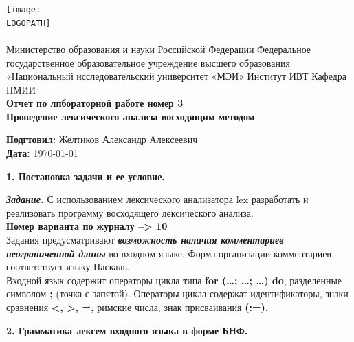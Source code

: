 \documentclass[12pt]{report}
\def \LOGOPATH {assets/logo3.png}
\def \DEPARTEMENT {Министерство образования и науки Российской Федерации 
Федеральное государственное образовательное учреждение высшего образования
\\ «Национальный исследовательский университет «МЭИ» 
Институт ИВТ
Кафедра ПМИИ
}
\def \REPORTTITLE {Отчет по лпбораторной работе номер 3 \\ Проведение лексического анализа восходящим методом}
\def \STUDENTNAME {Желтиков Александр Алексеевич}
\begin{document}

\begin{titlepage}
    \vfill
    \begin{center}
        \texttt{[image: \\LOGOPATH]} \\
        \hfill \\
        \Large{\DEPARTEMENT} \\
        \vfill
        \textbf{\LARGE{\REPORTTITLE}}
    \end{center}
    \vfill
    \begin{flushleft}
        \Large{\textbf{Подгтовил:} \STUDENTNAME} \\
        \Large{\textbf{Дата:} \today}
    \end{flushleft}
    \vfill
\end{titlepage}

\clearpage

\begin{center}
\Large{\textbf{1. Постановка задачи и ее условие.}}
\end{center}

\begin{flushleft}
    \text{}\newline 
    \textit{\textbf{Задание.}} С использованием лексического анализатора  lex разработать и реализовать программу восходящего лексического анализа. \\
    \text{}\newline
    \textbf{Номер варианта по журналу --> 10} \\
    \text{}\newline
    Задания предусматривают \textit{\textbf{возможность наличия комментариев неограниченной длины}} во входном языке. Форма организации комментариев соответствует языку Паскаль.\\
    Входной язык содержит операторы цикла типа \textbf{for (…; …; …) do}, разделенные символом \textbf{;} (точка с запятой). Операторы цикла содержат идентификаторы, знаки сравнения \textbf{<, >, =,} римские числа, знак присваивания \textbf{(:=)}.
\end{flushleft}
\begin{center}
\Large{\textbf{2. Грамматика лексем входного языка в форме БНФ.}}
\end{center}
\end{document}

